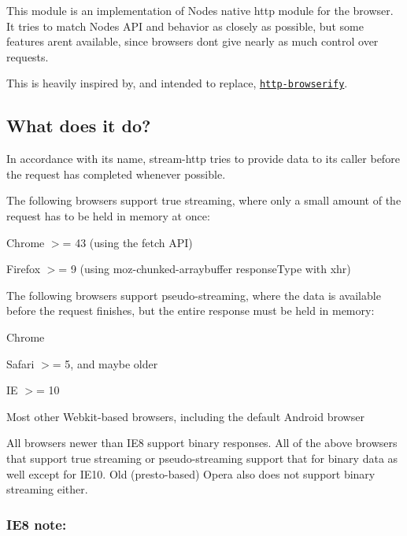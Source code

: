 \href{https://saucelabs.com/u/stream-http}{\tt }

This module is an implementation of Node\textquotesingle{}s native {\ttfamily http} module for the browser. It tries to match Node\textquotesingle{}s A\+PI and behavior as closely as possible, but some features aren\textquotesingle{}t available, since browsers don\textquotesingle{}t give nearly as much control over requests.

This is heavily inspired by, and intended to replace, \href{https://github.com/substack/http-browserify}{\tt http-\/browserify}.

\subsection*{What does it do?}

In accordance with its name, {\ttfamily stream-\/http} tries to provide data to its caller before the request has completed whenever possible.

The following browsers support true streaming, where only a small amount of the request has to be held in memory at once\+:
\begin{DoxyItemize}
\item Chrome $>$= 43 (using the {\ttfamily fetch} A\+PI)
\item Firefox $>$= 9 (using {\ttfamily moz-\/chunked-\/arraybuffer} response\+Type with xhr)
\end{DoxyItemize}

The following browsers support pseudo-\/streaming, where the data is available before the request finishes, but the entire response must be held in memory\+:
\begin{DoxyItemize}
\item Chrome
\item Safari $>$= 5, and maybe older
\item IE $>$= 10
\item Most other Webkit-\/based browsers, including the default Android browser
\end{DoxyItemize}

All browsers newer than I\+E8 support binary responses. All of the above browsers that support true streaming or pseudo-\/streaming support that for binary data as well except for I\+E10. Old (presto-\/based) Opera also does not support binary streaming either.

\subsubsection*{I\+E8 note\+:}

